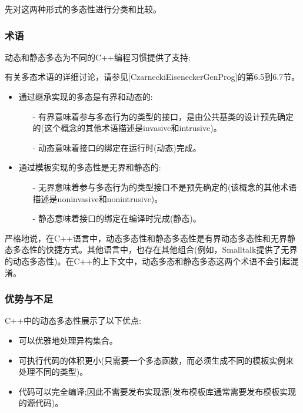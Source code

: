 
先对这两种形式的多态性进行分类和比较。

\subsubsection{术语}

动态和静态多态为不同的C++编程习惯提供了支持:

\begin{notice}有关多态术语的详细讨论，请参见[CzarneckiEiseneckerGenProg]的第6.5到6.7节。
\end{notice}

\begin{itemize}
\item 
通过继承实现的多态是有界和动态的:

\begin{itemize}
\item[-]
有界意味着参与多态行为的类型的接口，是由公共基类的设计预先确定的(这个概念的其他术语描述是invasive和intrusive)。

\item[-]
动态意味着接口的绑定在运行时(动态)完成。
\end{itemize}

\item 
通过模板实现的多态性是无界和静态的:

\begin{itemize}
\item[-]
无界意味着参与多态行为的类型接口不是预先确定的(该概念的其他术语描述是noninvasive和nonintrusive)。

\item[-]
静态意味着接口的绑定在编译时完成(静态)。
\end{itemize}
\end{itemize}

严格地说，在C++语言中，动态多态性和静态多态性是有界动态多态性和无界静态多态性的快捷方式。其他语言中，也存在其他组合(例如，Smalltalk提供了无界的动态多态性)。在C++的上下文中，动态多态和静态多态这两个术语不会引起混淆。

\subsubsection{优势与不足}

C++中的动态多态性展示了以下优点:

\begin{itemize}
\item 
可以优雅地处理异构集合。

\item 
可执行代码的体积更小(只需要一个多态函数，而必须生成不同的模板实例来处理不同的类型)。

\item 
代码可以完全编译;因此不需要发布实现源(发布模板库通常需要发布模板实现的源代码)。
\end{itemize}


